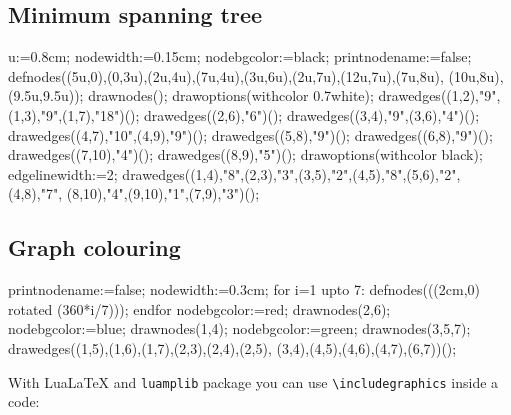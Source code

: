 \documentclass[11pt,a4paper,english]{article}
\begin{document}
\subsection*{Minimum spanning tree}
\begin{exemple}
u:=0.8cm;
nodewidth:=0.15cm;
nodebgcolor:=black;
printnodename:=false;
defnodes((5u,0),(0,3u),(2u,4u),(7u,4u),(3u,6u),(2u,7u),(12u,7u),(7u,8u),
                                                                   (10u,8u),(9.5u,9.5u));
drawnodes();
drawoptions(withcolor 0.7white);
drawedges((1,2),"9",(1,3),"9",(1,7),"18")();
drawedges((2,6),"6")();
drawedges((3,4),"9",(3,6),"4")();
drawedges((4,7),"10",(4,9),"9")();
drawedges((5,8),"9")();
drawedges((6,8),"9")();
drawedges((7,10),"4")();
drawedges((8,9),"5")();
drawoptions(withcolor black);
edgelinewidth:=2;
drawedges((1,4),"8",(2,3),"3",(3,5),"2",(4,5),"8",(5,6),"2",(4,8),"7",
                                                     (8,10),"4",(9,10),"1",(7,9),"3")();
\end{exemple}


\subsection*{Graph colouring}

\begin{exemple}[lefthand ratio = 0.6]
printnodename:=false;
nodewidth:=0.3cm;
for i=1 upto 7:
  defnodes(((2cm,0) rotated (360*i/7)));
endfor
nodebgcolor:=red;
drawnodes(2,6);
nodebgcolor:=blue;
drawnodes(1,4);
nodebgcolor:=green;
drawnodes(3,5,7);
drawedges((1,5),(1,6),(1,7),(2,3),(2,4),(2,5),
             (3,4),(4,5),(4,6),(4,7),(6,7))();
\end{exemple}

\bigskip
With Lua\LaTeX{} and \verb|luamplib| package you can use \verb|\includegraphics| inside a \MP{} code:
\end{document}
